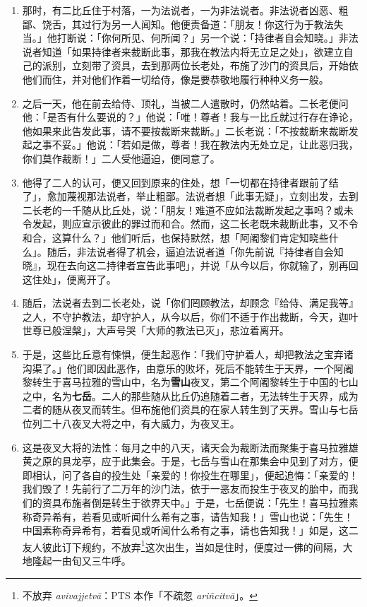 \begin{enumerate}
\item 那时，有二比丘住于村落，一为法说者，一为非法说者。非法说者凶恶、粗鄙、饶舌，其过行为另一人闻知。他便责备道：「朋友！你这行为于教法失当。」他打断说：「你何所见、何所闻？」另一个说：「持律者自会知晓。」非法说者知道「如果持律者来裁断此事，那我在教法内将无立足之处」，欲建立自己的派别，立刻带了资具，去到那两位长老处，布施了沙门的资具后，开始依他们而住，并对他们作着一切给侍，像是要恭敬地履行种种义务一般。
\item 之后一天，他在前去给侍、顶礼，当被二人遣散时，仍然站着。二长老便问他：「是否有什么要说的？」他说：「唯！尊者！我与一比丘就过行存在诤论，他如果来此告发此事，请不要按裁断来裁断。」二长老说：「不按裁断来裁断发起之事不妥。」他说：「若如是做，尊者！我在教法内无处立足，让此恶归我，你们莫作裁断！」二人受他逼迫，便同意了。
\item 他得了二人的认可，便又回到原来的住处，想「一切都在持律者跟前了结了」，愈加蔑视那法说者，举止粗鄙。法说者想「此事无疑」，立刻出发，去到二长老的一千随从比丘处，说：「朋友！难道不应如法裁断发起之事吗？或未令发起，则应宣示彼此的罪过而和合。然而，这二长老既未裁断此事，又不令和合，这算什么？」他们听后，也保持默然，想「阿阇黎们肯定知晓些什么」。随后，非法说者得了机会，逼迫法说者道「你先前说『持律者自会知晓』，现在去向这二持律者宣告此事吧」，并说「从今以后，你就输了，别再回这住处」，便离开了。
\item 随后，法说者去到二长老处，说「你们罔顾教法，却顾念『给侍、满足我等』之人，不守护教法，却守护人，从今以后，你们不适于作出裁断，今天，迦叶世尊已般涅槃」，大声号哭「大师的教法已灭」，悲泣着离开。
\item 于是，这些比丘意有悚惧，便生起恶作：「我们守护着人，却把教法之宝弃诸沟渠了。」他们即因此恶作，由意乐的败坏，死后不能转生于天界，一个阿阇黎转生于喜马拉雅的雪山中，名为\textbf{雪山}夜叉，第二个阿阇黎转生于中国的七山之中，名为\textbf{七岳}。二人的那些随从比丘仍追随着二者，无法转生于天界，成为二者的随从夜叉而转生。但布施他们资具的在家人转生到了天界。雪山与七岳位列二十八夜叉大将之中，有大威力，为夜叉王。
\item 这是夜叉大将的法性：每月之中的八天，诸天会为裁断法而聚集于喜马拉雅雄黄之原的具龙亭，应于此集会。于是，七岳与雪山在那集会中见到了对方，便即相认，问了各自的投生处「亲爱的！你投生在哪里」，便起追悔：「亲爱的！我们毁了！先前行了二万年的沙门法，依于一恶友而投生于夜叉的胎中，而我们的资具布施者倒是转生于欲界天中。」于是，七岳便说：「先生！喜马拉雅素称奇异希有，若看见或听闻什么希有之事，请告知我！」雪山也说：「先生！中国素称奇异希有，若看见或听闻什么希有之事，请也告知我！」如是，这二友人彼此订下规约，不放弃\footnote{不放弃 \textit{avivajjetvā}：PTS 本作「不疏忽 \textit{ariñcitvā}」。}这次出生，当如是住时，便度过一佛的间隔，大地隆起一由旬又三牛呼。

\end{enumerate}
